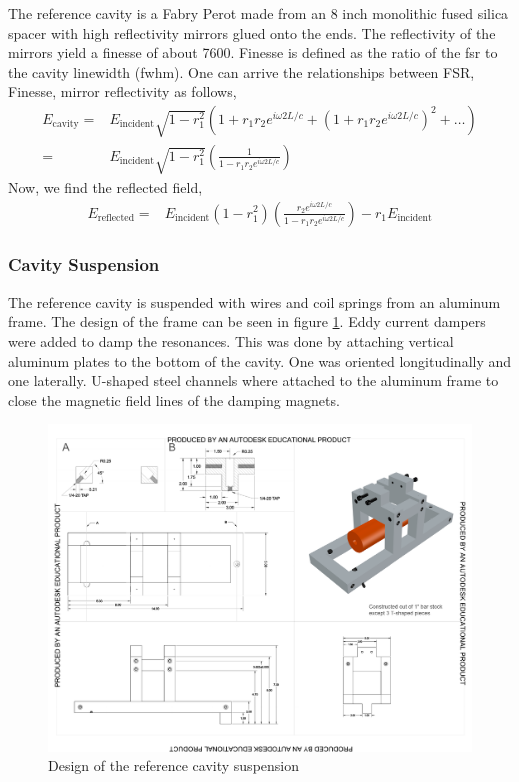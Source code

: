 The reference cavity is a Fabry Perot made from an 8 inch monolithic fused silica
spacer with high reflectivity mirrors glued onto the ends. The reflectivity
of the mirrors yield a finesse of about 7600. Finesse is defined as the ratio
of the \ac{fsr} to the cavity linewidth (\ac{fwhm}). One can arrive the
relationships between FSR, Finesse, mirror reflectivity as follows,
\begin{align}
E_{\mathrm{cavity}} =& E_{\mathrm{incident}} \sqrt{1-r_1^2} \left( 1 + r_1 r_2
    e^{i \omega 2 L /c} + \left(1+r_1 r_2 e^{i \omega 2L/c} \right)^2 + \ldots \right)
    \\
=& E_{\mathrm{incident}} \sqrt{1-r_1^2} \left( \frac{1}{1 - r_1 r_2
    e^{i \omega 2L/c}} \right)
\end{align}
Now, we find the reflected field,
\begin{align}
E_{\mathrm{reflected}} =& E_{\mathrm{incident}} \left( 1-r_1^2 \right)
    \left( \frac{r_2 e^{i \omega 2L/c}}{1 - r_1 r_2 e^{i \omega 2L/c}} \right)
    - r_1 E_{\mathrm{incident}}
\end{align}

\subsubsection{Cavity Suspension}

The reference cavity is suspended with wires and coil springs from an aluminum
frame. The design of the frame can be seen in figure
\ref{fig:refcav_sus}.
Eddy current dampers were added to damp the resonances. This was done by
attaching vertical aluminum plates to the bottom of the cavity. One was
oriented longitudinally and one laterally.
U-shaped steel channels where attached to the aluminum frame to close the
magnetic field lines of the damping magnets.

\begin{figure}[htbp]
	\centering
		\includegraphics[width=15cm]{./figures/refcavsusdesign.pdf}
	\caption[Reference Cavity Suspension Design]{Design of the reference cavity suspension}
	\label{fig:refcav_sus}
\end{figure}


